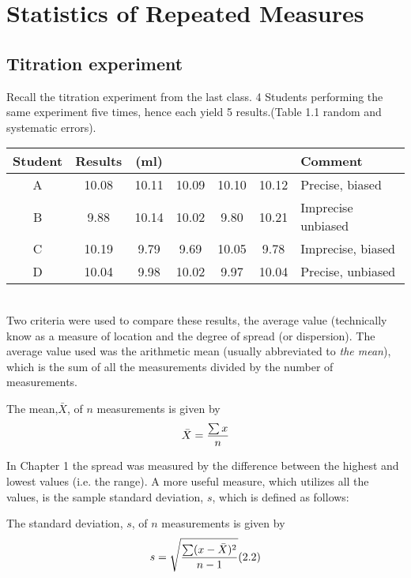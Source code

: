 \section{Statistics of Repeated Measures}
\subsection{Titration experiment}

Recall the titration experiment from the last class. 4 Students performing the same experiment five times, hence each yield 5 results.(Table 1.1 random and systematic errors).


\begin{tabular}{|c|ccccc|l|}
	\hline
	Student & Results  & (ml) &  &  &  &Comment \\ \hline
	A & 10.08 & 10.11 &10.09 &10.10&10.12 & Precise, biased\\ \hline
	B & 9.88 &10.14& 10.02 &9.80& 10.21& Imprecise unbiased\\ \hline
	C & 10.19 &9.79& 9.69 &10.05& 9.78 & Imprecise, biased\\ \hline
	D & 10.04 &9.98 &10.02 &9.97 &10.04 & Precise, unbiased \\
	\hline
\end{tabular}\\




Two criteria were used to compare these results, the average value (technically know
as a measure of location and the degree of spread (or dispersion). The average value
used was the arithmetic mean (usually abbreviated to \emph{the mean}), which is the sum
of all the measurements divided by the number of measurements.


The mean,$\bar{X}$, of $n$ measurements is given by \[ \bar{X}  = {\sum{x} \over n} \]

In Chapter 1 the spread was measured by the difference between the highest and
lowest values (i.e. the range). A more useful measure, which utilizes all the values, is the sample
standard deviation, $s$, which is defined as follows:

The standard deviation, $s$, of $n$ measurements is given by
\[s=  \sqrt{ {\sum(x-\bar{X})^2 \over n-1} }  (2.2) \]









